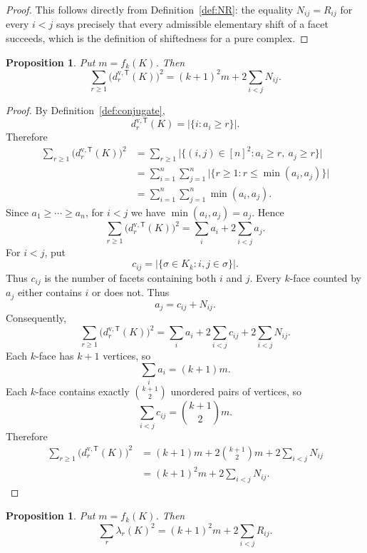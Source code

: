 \documentclass[11pt,reqno]{amsart}
\numberwithin{equation}{section}
\theoremstyle{plain}
\newtheorem{proposition}[theorem]{Proposition}
\theoremstyle{definition}
\newcommand{\T}{\mathsf{T}}
\begin{document}
\begin{proof}
This follows directly from Definition~\ref{def:NR}: the equality $N_{ij}=R_{ij}$ for every
$i<j$ says precisely that every admissible elementary shift of a facet succeeds, which is the
definition of shiftedness for a pure complex.
\end{proof}



\begin{proposition}\label{prop:degreemoment}
Put $m=f_k(K)$. Then
\[
  \sum_{r\ge1}\bigl(d^{\mathrm v,\T}_r(K)\bigr)^2
  =(k+1)^2m+2\sum_{i<j}N_{ij}.
\]
\end{proposition}

\begin{proof}
By Definition~\ref{def:conjugate},
\[
  d^{\mathrm v,\T}_r(K)=\bigl|\{i:a_i\ge r\}\bigr|.
\]
Therefore
\[
\begin{split}
\sum_{r\ge1}\bigl(d^{\mathrm v,\T}_r(K)\bigr)^2
&=\sum_{r\ge1}
  \bigl|\{(i,j)\in[n]^2:a_i\ge r,\ a_j\ge r\}\bigr|\\
&=\sum_{i=1}^n\sum_{j=1}^n
  \bigl|\{r\ge1:r\le\min(a_i,a_j)\}\bigr|\\
&=\sum_{i=1}^n\sum_{j=1}^n\min(a_i,a_j).
\end{split}
\]
Since $a_1\ge\cdots\ge a_n$, for $i<j$ we have $\min(a_i,a_j)=a_j$. Hence
\[
\sum_{r\ge1}\bigl(d^{\mathrm v,\T}_r(K)\bigr)^2
=\sum_i a_i+2\sum_{i<j}a_j.
\]
For $i<j$, put
\[
  c_{ij}=\bigl|\{\sigma\in K_k:i,j\in\sigma\}\bigr|.
\]
Thus $c_{ij}$ is the number of facets containing both $i$ and $j$.
Every $k$-face counted by $a_j$ either contains $i$ or does not. Thus
\[
a_j=c_{ij}+N_{ij}.
\]
Consequently,
\[
\sum_{r\ge1}\bigl(d^{\mathrm v,\T}_r(K)\bigr)^2
=\sum_i a_i+2\sum_{i<j}c_{ij}+2\sum_{i<j}N_{ij}.
\]
Each $k$-face has $k+1$ vertices, so
\[
\sum_i a_i=(k+1)m.
\]
Each $k$-face contains exactly $\binom{k+1}{2}$ unordered pairs of vertices, so
\[
\sum_{i<j}c_{ij}=\binom{k+1}{2}m.
\]
Therefore
\[
\begin{split}
\sum_{r\ge1}\bigl(d^{\mathrm v,\T}_r(K)\bigr)^2
&=(k+1)m+2\binom{k+1}{2}m+2\sum_{i<j}N_{ij}\\
&=(k+1)^2m+2\sum_{i<j}N_{ij}.
\end{split}
\]
\end{proof}



\begin{proposition}\label{prop:spectralmoment}
Put $m=f_k(K)$. Then
\[
  \sum_r \lambda_r(K)^2
  =(k+1)^2m+2\sum_{i<j}R_{ij}.
\]
\end{proposition}
\end{document}
